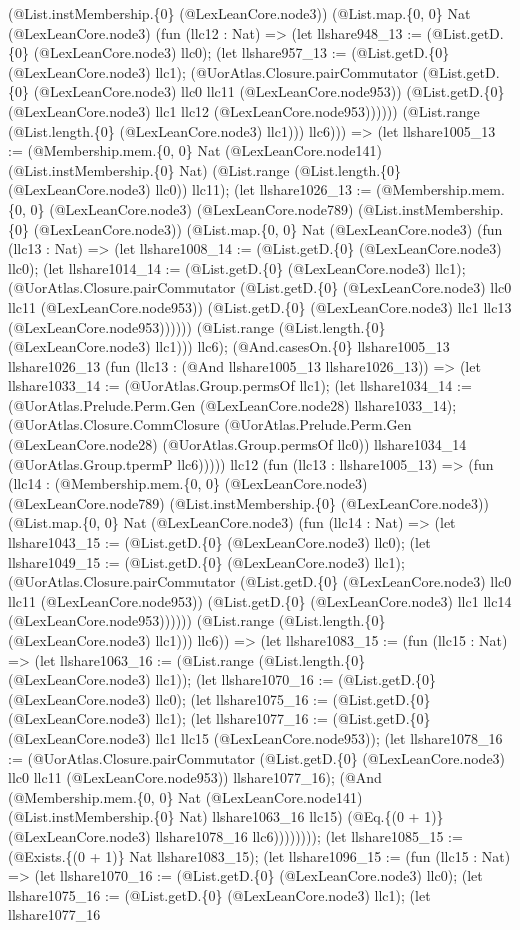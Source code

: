 \documentclass[11pt]{article}
\begin{document}
(@List.instMembership.\{0\} (@LexLeanCore.node3)) (@List.map.\{0, 0\} Nat (@LexLeanCore.node3) (fun (llc12 : Nat) => (let llshare948\_13 := (@List.getD.\{0\} (@LexLeanCore.node3) llc0); (let llshare957\_13 := (@List.getD.\{0\} (@LexLeanCore.node3) llc1); (@UorAtlas.Closure.pairCommutator (@List.getD.\{0\} (@LexLeanCore.node3) llc0 llc11 (@LexLeanCore.node953)) (@List.getD.\{0\} (@LexLeanCore.node3) llc1 llc12 (@LexLeanCore.node953)))))) (@List.range (@List.length.\{0\} (@LexLeanCore.node3) llc1))) llc6))) => (let llshare1005\_13 := (@Membership.mem.\{0, 0\} Nat (@LexLeanCore.node141) (@List.instMembership.\{0\} Nat) (@List.range (@List.length.\{0\} (@LexLeanCore.node3) llc0)) llc11); (let llshare1026\_13 := (@Membership.mem.\{0, 0\} (@LexLeanCore.node3) (@LexLeanCore.node789) (@List.instMembership.\{0\} (@LexLeanCore.node3)) (@List.map.\{0, 0\} Nat (@LexLeanCore.node3) (fun (llc13 : Nat) => (let llshare1008\_14 := (@List.getD.\{0\} (@LexLeanCore.node3) llc0); (let llshare1014\_14 := (@List.getD.\{0\} (@LexLeanCore.node3) llc1); (@UorAtlas.Closure.pairCommutator (@List.getD.\{0\} (@LexLeanCore.node3) llc0 llc11 (@LexLeanCore.node953)) (@List.getD.\{0\} (@LexLeanCore.node3) llc1 llc13 (@LexLeanCore.node953)))))) (@List.range (@List.length.\{0\} (@LexLeanCore.node3) llc1))) llc6); (@And.casesOn.\{0\} llshare1005\_13 llshare1026\_13 (fun (llc13 : (@And llshare1005\_13 llshare1026\_13)) => (let llshare1033\_14 := (@UorAtlas.Group.permsOf llc1); (let llshare1034\_14 := (@UorAtlas.Prelude.Perm.Gen (@LexLeanCore.node28) llshare1033\_14); (@UorAtlas.Closure.CommClosure (@UorAtlas.Prelude.Perm.Gen (@LexLeanCore.node28) (@UorAtlas.Group.permsOf llc0)) llshare1034\_14 (@UorAtlas.Group.tpermP llc6))))) llc12 (fun (llc13 : llshare1005\_13) => (fun (llc14 : (@Membership.mem.\{0, 0\} (@LexLeanCore.node3) (@LexLeanCore.node789) (@List.instMembership.\{0\} (@LexLeanCore.node3)) (@List.map.\{0, 0\} Nat (@LexLeanCore.node3) (fun (llc14 : Nat) => (let llshare1043\_15 := (@List.getD.\{0\} (@LexLeanCore.node3) llc0); (let llshare1049\_15 := (@List.getD.\{0\} (@LexLeanCore.node3) llc1); (@UorAtlas.Closure.pairCommutator (@List.getD.\{0\} (@LexLeanCore.node3) llc0 llc11 (@LexLeanCore.node953)) (@List.getD.\{0\} (@LexLeanCore.node3) llc1 llc14 (@LexLeanCore.node953)))))) (@List.range (@List.length.\{0\} (@LexLeanCore.node3) llc1))) llc6)) => (let llshare1083\_15 := (fun (llc15 : Nat) => (let llshare1063\_16 := (@List.range (@List.length.\{0\} (@LexLeanCore.node3) llc1)); (let llshare1070\_16 := (@List.getD.\{0\} (@LexLeanCore.node3) llc0); (let llshare1075\_16 := (@List.getD.\{0\} (@LexLeanCore.node3) llc1); (let llshare1077\_16 := (@List.getD.\{0\} (@LexLeanCore.node3) llc1 llc15 (@LexLeanCore.node953)); (let llshare1078\_16 := (@UorAtlas.Closure.pairCommutator (@List.getD.\{0\} (@LexLeanCore.node3) llc0 llc11 (@LexLeanCore.node953)) llshare1077\_16); (@And (@Membership.mem.\{0, 0\} Nat (@LexLeanCore.node141) (@List.instMembership.\{0\} Nat) llshare1063\_16 llc15) (@Eq.\{(0 + 1)\} (@LexLeanCore.node3) llshare1078\_16 llc6)))))))); (let llshare1085\_15 := (@Exists.\{(0 + 1)\} Nat llshare1083\_15); (let llshare1096\_15 := (fun (llc15 : Nat) => (let llshare1070\_16 := (@List.getD.\{0\} (@LexLeanCore.node3) llc0); (let llshare1075\_16 := (@List.getD.\{0\} (@LexLeanCore.node3) llc1); (let llshare1077\_16 
\end{document}
